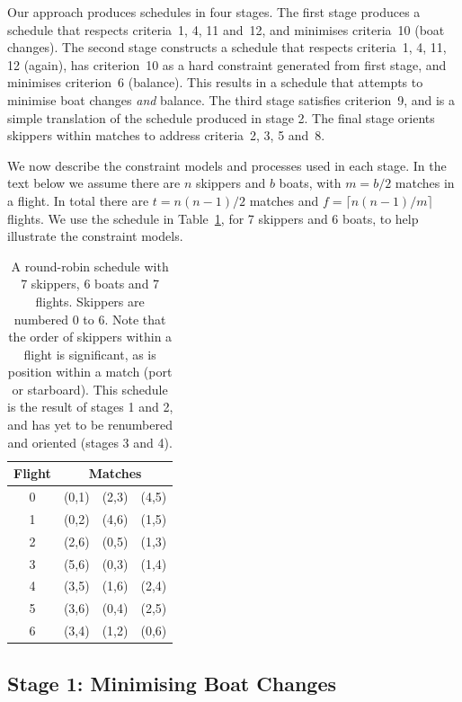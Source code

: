 \documentclass{llncs}
\begin{document}
Our approach produces schedules in four stages. The first stage produces a schedule that respects
criteria~1, 4, 11 and~12, and minimises criteria~10 (boat changes). The second stage constructs a
schedule that respects criteria~1, 4, 11, 12 (again), has criterion~10 as a hard constraint generated
from first stage, and minimises criterion~6 (balance). This results in a schedule that attempts to
minimise boat changes \emph{and} balance. The third stage satisfies criterion~9, and is a simple
translation of the schedule produced in stage 2.  The final stage orients skippers within matches to
address criteria~2, 3, 5 and~8.

We now describe the constraint models and processes used in each stage. In the text below we assume
there are $n$ skippers and $b$ boats, with $m = b/2$ matches in a flight. In total there are $t =
n(n-1)/2$ matches and $f = \lceil n(n-1)/m  \rceil$ flights. We use the schedule in
Table~\ref{tab1}, for 7 skippers and 6 boats, to help illustrate the constraint models. 

\begin{table}
    \setlength{\tabcolsep}{3pt}
    \begin{tabular}{cccc}
        \toprule
        Flight & \multicolumn{3}{c}{Matches} \\ \midrule
        0 & (0,1) & (2,3) & (4,5) \\
        1 & (0,2) & (4,6) & (1,5) \\
        2 & (2,6) & (0,5) & (1,3) \\
        3 & (5,6) & (0,3) & (1,4) \\
        4 & (3,5) & (1,6) & (2,4) \\
        5 & (3,6) & (0,4) & (2,5) \\
        6 & (3,4) & (1,2) & (0,6) \\ \bottomrule
    \end{tabular}
    \caption{A round-robin schedule with 7 skippers, 6 boats and 7 flights.  Skippers are numbered 0
        to 6. Note that the order of skippers within a flight is significant, as is position within
        a match (port or starboard). This schedule is the result of stages 1 and 2, and has yet to
        be renumbered and oriented (stages 3 and 4).} \label{tab1}
\end{table}

\subsection{Stage 1: Minimising Boat Changes}
\end{document}

